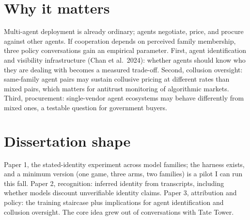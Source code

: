 \documentclass[10pt]{article}
\begin{document}
\section{Why it matters}
Multi-agent deployment is already ordinary; agents negotiate, price, and procure against other agents. If cooperation depends on perceived family membership, three policy conversations gain an empirical parameter. First, agent identification and visibility infrastructure (Chan et al.\ 2024): whether agents should know who they are dealing with becomes a measured trade-off. Second, collusion oversight: same-family agent pairs may sustain collusive pricing at different rates than mixed pairs, which matters for antitrust monitoring of algorithmic markets. Third, procurement: single-vendor agent ecosystems may behave differently from mixed ones, a testable question for government buyers.

\section{Dissertation shape}
Paper 1, the stated-identity experiment across model families; the harness exists, and a minimum version (one game, three arms, two families) is a pilot I can run this fall. Paper 2, recognition: inferred identity from transcripts, including whether models discount unverifiable identity claims. Paper 3, attribution and policy: the training staircase plus implications for agent identification and collusion oversight. The core idea grew out of conversations with Tate Tower.
\end{document}
